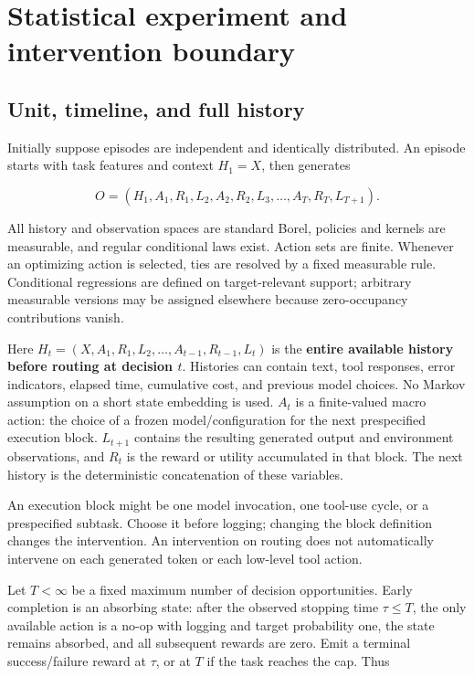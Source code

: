 \section{Statistical experiment and intervention boundary}\label{statistical-experiment-and-intervention-boundary}

\subsection{Unit, timeline, and full history}\label{unit-timeline-and-full-history}

Initially suppose episodes are independent and identically distributed. An episode starts with task features and context \(H_1=X\), then generates

\[
O=(H_1,A_1,R_1,L_2,A_2,R_2,L_3,\ldots,A_T,R_T,L_{T+1}).
\]

All history and observation spaces are standard Borel, policies and kernels are measurable, and regular conditional laws exist. Action sets are finite. Whenever an optimizing action is selected, ties are resolved by a fixed measurable rule. Conditional regressions are defined on target-relevant support; arbitrary measurable versions may be assigned elsewhere because zero-occupancy contributions vanish.

Here \(H_t=(X,A_1,R_1,L_2,\ldots,A_{t-1},R_{t-1},L_t)\) is the \textbf{entire available history before routing at decision \(t\)}. Histories can contain text, tool responses, error indicators, elapsed time, cumulative cost, and previous model choices. No Markov assumption on a short state embedding is used. \(A_t\) is a finite-valued macro action: the choice of a frozen model/configuration for the next prespecified execution block. \(L_{t+1}\) contains the resulting generated output and environment observations, and \(R_t\) is the reward or utility accumulated in that block. The next history is the deterministic concatenation of these variables.

An execution block might be one model invocation, one tool-use cycle, or a prespecified subtask. Choose it before logging; changing the block definition changes the intervention. An intervention on routing does not automatically intervene on each generated token or each low-level tool action.

Let \(T<\infty\) be a fixed maximum number of decision opportunities. Early completion is an absorbing state: after the observed stopping time \(\tau\le T\), the only available action is a no-op with logging and target probability one, the state remains absorbed, and all subsequent rewards are zero. Emit a terminal success/failure reward at \(\tau\), or at \(T\) if the task reaches the cap. Thus

